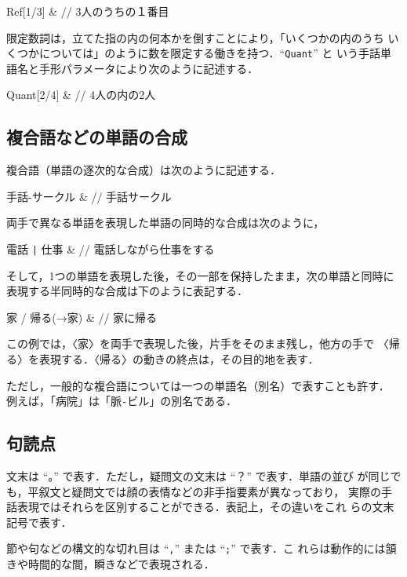 \begin{ex}
Ref[1/3] & // 3人のうちの１番目
\end{ex}

限定数詞は，立てた指の内の何本かを倒すことにより，「いくつかの内のうち
いくつかについては」のように数を限定する働きを持つ．``{\tt Quant}'' と
いう手話単語名と手形パラメータにより次のように記述する．

\begin{ex}
Quant[2/4] & // 4人の内の2人  
\end{ex}

\subsection{複合語などの単語の合成}
\label{sec:compound}

複合語（単語の逐次的な合成）は次のように記述する．

\begin{ex}
  手話-サークル & // 手話サークル
\end{ex}


両手で異なる単語を表現した単語の同時的な合成は次のように，

\begin{ex}
  電話 \verb+|+ 仕事 & // 電話しながら仕事をする
\end{ex}

そして，1つの単語を表現した後，その一部を保持したまま，次の単語と同時に
表現する半同時的な合成は下のように表記する．

\begin{ex}
  家 / 帰る(→家) & // 家に帰る
\end{ex}


この例では，〈家〉を両手で表現した後，片手をそのまま残し，他方の手で
〈帰る〉を表現する．〈帰る〉の動きの終点は，その目的地を表す．

ただし，一般的な複合語については一つの単語名（別名）で表すことも許す．
例えば，「病院」は「脈{\tt -}ビル」の別名である．

\subsection{句読点}
\label{sec:punctuation}

文末は ``。\unskip'' で表す．ただし，疑問文の文末は ``？'' で表す．単語の並び
が同じでも，平叙文と疑問文では顔の表情などの非手指要素が異なっており，
実際の手話表現ではそれらを区別することができる．表記上，その違いをこれ
らの文末記号で表す．

節や句などの構文的な切れ目は ``{\tt ,}'' または ``{\tt ;}'' で表す．こ
れらは動作的には頷きや時間的な間，瞬きなどで表現される．

